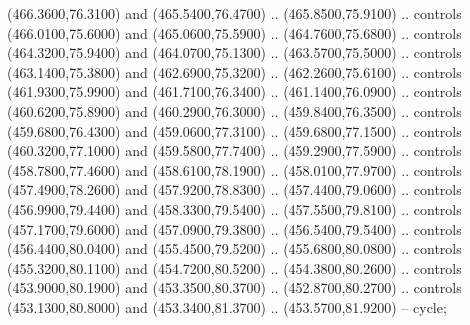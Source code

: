 {\begin{scope}[y=0.80pt, x=0.80pt, yscale=-1, xscale=1, inner sep=0pt, outer sep=0pt, #1]
      (466.3600,76.3100) and (465.5400,76.4700) .. (465.8500,75.9100) .. controls
      (466.0100,75.6000) and (465.0600,75.5900) .. (464.7600,75.6800) .. controls
      (464.3200,75.9400) and (464.0700,75.1300) .. (463.5700,75.5000) .. controls
      (463.1400,75.3800) and (462.6900,75.3200) .. (462.2600,75.6100) .. controls
      (461.9300,75.9900) and (461.7100,76.3400) .. (461.1400,76.0900) .. controls
      (460.6200,75.8900) and (460.2900,76.3000) .. (459.8400,76.3500) .. controls
      (459.6800,76.4300) and (459.0600,77.3100) .. (459.6800,77.1500) .. controls
      (460.3200,77.1000) and (459.5800,77.7400) .. (459.2900,77.5900) .. controls
      (458.7800,77.4600) and (458.6100,78.1900) .. (458.0100,77.9700) .. controls
      (457.4900,78.2600) and (457.9200,78.8300) .. (457.4400,79.0600) .. controls
      (456.9900,79.4400) and (458.3300,79.5400) .. (457.5500,79.8100) .. controls
      (457.1700,79.6000) and (457.0900,79.3800) .. (456.5400,79.5400) .. controls
      (456.4400,80.0400) and (455.4500,79.5200) .. (455.6800,80.0800) .. controls
      (455.3200,80.1100) and (454.7200,80.5200) .. (454.3800,80.2600) .. controls
      (453.9000,80.1900) and (453.3500,80.3700) .. (452.8700,80.2700) .. controls
      (453.1300,80.8000) and (453.3400,81.3700) .. (453.5700,81.9200) -- cycle;


\end{scope}}
